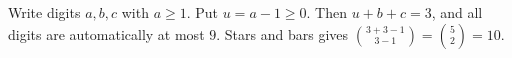 Write digits $a,b,c$ with $a\ge 1$. Put $u=a-1\ge 0$. Then $u+b+c=3$, and all digits are automatically at most $9$. Stars and bars gives $\binom{3+3-1}{3-1}=\binom 52=\boxed{10}$.
